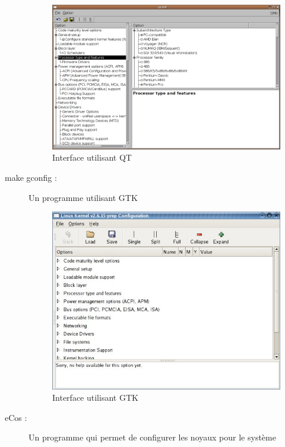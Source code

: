 \documentclass[17pts]{report}
\begin{document}
\begin{description}
        \begin{figure}[H]
            \includegraphics[scale=0.4]{illustrations/xconfig.png}
            \centering
            \caption{Interface utilisant QT}
            \label{fig:MakeXconfig}
        \end{figure}
        \pagebreak
\item[make gconfig :]             Un programme utilisant GTK \\
        \begin{figure}[H]
            \includegraphics[scale=0.9]{illustrations/gconfig.jpg}
            \centering
            \caption{Interface utilisant GTK}
            \label{fig:MakeGconfig}
        \end{figure}
    \item[eCos :] Un programme qui permet de configurer les noyaux pour le système

\end{description}
\end{document}
